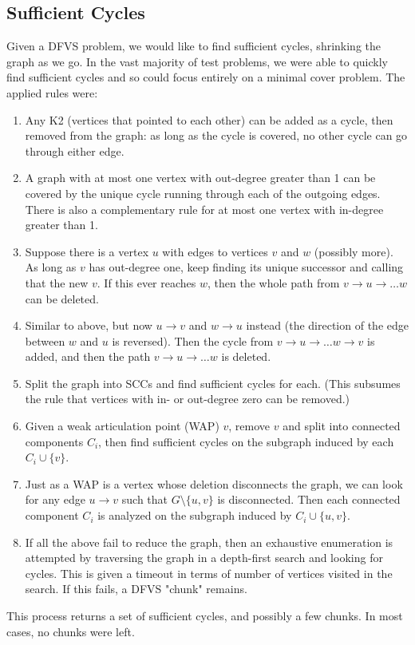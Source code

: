 \documentclass[a4paper,11pt]{article}
\newcommand{\9}{\,\,\,\,\,\,\,\,\,}
\begin{document}
\subsection{Sufficient Cycles}
Given a DFVS problem, we would like to find sufficient cycles, shrinking the graph as we go.  In the vast majority of test problems, we were able to quickly find sufficient cycles and so could focus entirely on a minimal cover problem. The applied rules were:
\begin{enumerate}
\item Any K2 (vertices that pointed to each other) can be added as a cycle, then removed from the graph: as long as the cycle is covered, no other cycle can go through either edge.
\item A graph with at most one vertex with out-degree greater than 1 can be covered by the unique cycle running through each of the outgoing edges. There is also a complementary rule for at most one vertex with in-degree greater than 1.
\item Suppose there is a vertex $u$ with edges to vertices $v$ and $w$ (possibly more). As long as $v$ has out-degree one, keep finding its unique successor and calling that the new $v$. If this ever reaches $w$, then the whole path from $v\to u\to \dots w$ can be deleted.
\item Similar to above, but now $u\to v$ and $w\to u$ instead (the direction of the edge between $w$ and $u$ is reversed). Then the cycle from $v\to u\to \dots w\to v$ is added, and then the path $v\to u\to\dots w$ is deleted.
\item Split the graph into SCCs and find sufficient cycles for each. (This subsumes the rule that vertices with in- or out-degree zero can be removed.)
\item Given a weak articulation point (WAP) $v$, remove $v$ and split into connected components $C_i$, then find sufficient cycles on the subgraph induced by each $C_i\cup\{v\}$.
\item Just as a WAP is a vertex whose deletion disconnects the graph, we can look for any edge $u\to v$ such that $G\setminus \{u,v\}$ is disconnected. Then each connected component $C_i$ is analyzed on the subgraph induced by $C_i\cup\{u,v\}$.
\item If all the above fail to reduce the graph, then an exhaustive enumeration is attempted by traversing the graph in a depth-first search and looking for cycles. This is given a timeout in terms of number of vertices visited in the search. If this fails, a DFVS "chunk" remains.
\end{enumerate}
This process returns a set of sufficient cycles, and possibly a few chunks. In most cases, no chunks were left.
\end{document}
